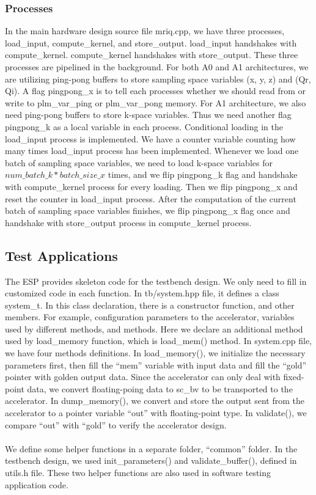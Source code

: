\subsubsection{Processes}

In the main hardware design source file mriq.cpp, we have three processes,
load\_input, compute\_kernel, and store\_output. load\_input handshakes with
compute\_kernel. compute\_kernel handshakes with store\_output. These three
processes are pipelined in the background. For both A0 and A1 architectures, we
are utilizing ping-pong buffers to store sampling space variables (x, y, z) and
(Qr, Qi). A flag pingpong\_x is to tell each processes whether we should read
from or write to plm\_var\_ping or plm\_var\_pong memory. For A1 architecture,
we also need ping-pong buffers to store k-space variables. Thus we need another
flag pingpong\_k as a local variable in each process. Conditional loading in the
load\_input process is implemented. We have a counter variable counting how many
times load\_input process has been implemented. Whenever we load one batch of
sampling space variables, we need to load k-space variables for $num\_batch\_k *
batch\_size\_x$ times, and we flip pingpong\_k flag and handshake with
compute\_kernel process for every loading. Then we flip pingpong\_x and reset
the counter in load\_input process. After the computation of the current batch
of sampling space variables finishes, we flip pingpong\_x flag once and
handshake with store\_output process in compute\_kernel process. \\

\subsection{Test Applications}

The ESP provides skeleton code for the testbench design. We only need to fill in
customized code in each function. In tb/system.hpp file, it defines a class
system\_t. In this class declaration, there is a constructor function, and other
members. For example, configuration parameters to the accelerator, variables
used by different methods, and methods. Here we declare an additional method
used by load\_memory function, which is load\_mem() method. In system.cpp file,
we have four methods definitions. In load\_memory(), we initialize the necessary
parameters first, then fill the ``mem'' variable with input data and fill the
``gold'' pointer with golden output data. Since the accelerator can only deal with
fixed-point data, we convert floating-poing data to sc\_bv to be transported to
the accelerator. In dump\_memory(), we convert and store the output sent from
the accelerator to a pointer variable ``out'' with floating-point type. In
validate(), we compare ``out'' with ``gold'' to verify the accelerator
design. \\ \\ We define some helper functions in a separate folder, ``common''
folder. In the testbench design, we used init\_parameters() and
validate\_buffer(), defined in utils.h file. These two helper functions are also
used in software testing application code.\\

